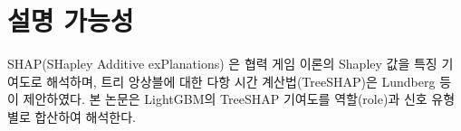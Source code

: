 
\section{설명 가능성}
\label{sec:bg-shap}

SHAP(SHapley Additive exPlanations) \cite{lundberg2017unified}은 협력 게임 이론의 Shapley 값을 특징 기여도로 해석하며, 트리 앙상블에 대한 다항 시간 계산법(TreeSHAP)은 Lundberg 등 \cite{lundberg2020local}이 제안하였다. 본 논문은 LightGBM의 TreeSHAP 기여도를 역할(role)과 신호 유형별로 합산하여 해석한다.
